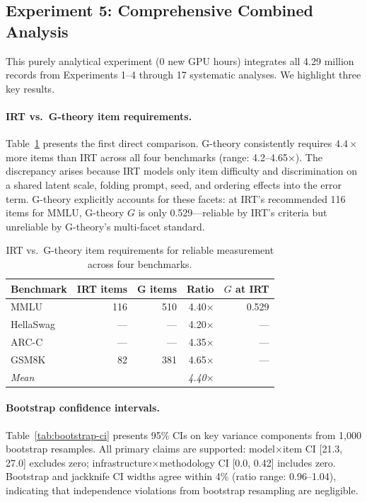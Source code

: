 \documentclass[letterpaper]{article}
\newcommand{\gcoeff}{\ensuremath{G}}
\newcommand{\pct}{\%}
\begin{document}
\subsection{Experiment 5: Comprehensive Combined Analysis}

This purely analytical experiment (0 new GPU hours) integrates all 4.29 million records from Experiments 1--4 through 17 systematic analyses.
We highlight three key results.

\paragraph{IRT vs.\ G-theory item requirements.}
Table~\ref{tab:irt} presents the first direct comparison.
G-theory consistently requires $4.4\times$ more items than IRT across all four benchmarks (range: 4.2--4.65$\times$).
The discrepancy arises because IRT models only item difficulty and discrimination on a shared latent scale, folding prompt, seed, and ordering effects into the error term.
G-theory explicitly accounts for these facets: at IRT's recommended 116 items for MMLU, G-theory $\gcoeff{}$ is only 0.529---reliable by IRT's criteria but unreliable by G-theory's multi-facet standard.

\begin{table}[t]
\centering
\caption{IRT vs.\ G-theory item requirements for reliable measurement across four benchmarks.}
\label{tab:irt}
\small
\begin{tabular}{lrrrr}
\toprule
Benchmark & IRT items & G items & Ratio & $\gcoeff{}$ at IRT \\
\midrule
MMLU      & 116 & 510 & 4.40$\times$ & 0.529 \\
HellaSwag & --- & --- & 4.20$\times$ & --- \\
ARC-C     & --- & --- & 4.35$\times$ & --- \\
GSM8K     & 82  & 381 & 4.65$\times$ & --- \\
\midrule
\textit{Mean} & & & \textit{4.40$\times$} & \\
\bottomrule
\end{tabular}
\end{table}

\paragraph{Bootstrap confidence intervals.}
Table~\ref{tab:bootstrap-ci} presents 95\pct{} CIs on key variance components from 1,000 bootstrap resamples.
All primary claims are supported: model$\times$item CI [21.3, 27.0] excludes zero; infrastructure$\times$methodology CI [0.0, 0.42] includes zero.
Bootstrap and jackknife CI widths agree within 4\pct{} (ratio range: 0.96--1.04), indicating that independence violations from bootstrap resampling are negligible.
\end{document}
